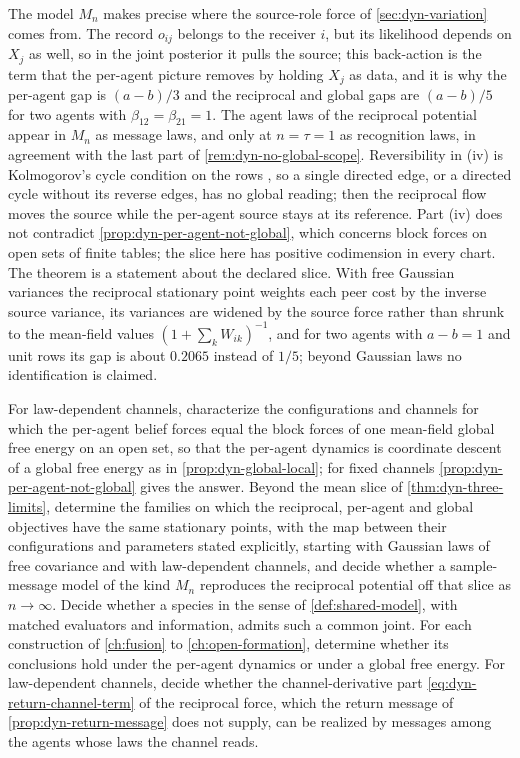The model $M_n$ makes precise where the source-role force of \cref{sec:dyn-variation} comes from. The record $o_{ij}$ belongs to the receiver $i$, but its likelihood depends on $X_j$ as well, so in the joint posterior it pulls the source; this back-action is the term that the per-agent picture removes by holding $X_j$ as data, and it is why the per-agent gap is $(a-b)/3$ and the reciprocal and global gaps are $(a-b)/5$ for two agents with $\beta_{12}=\beta_{21}=1$. The agent laws of the reciprocal potential appear in $M_n$ as message laws, and only at $n=\tau=1$ as recognition laws, in agreement with the last part of \cref{rem:dyn-no-global-scope}. Reversibility in (iv) is Kolmogorov's cycle condition on the rows \citep{Kolmogorov1936,Kelly1979}, so a single directed edge, or a directed cycle without its reverse edges, has no global reading; then the reciprocal flow moves the source while the per-agent source stays at its reference. Part (iv) does not contradict \cref{prop:dyn-per-agent-not-global}, which concerns block forces on open sets of finite tables; the slice here has positive codimension in every chart. The theorem is a statement about the declared slice. With free Gaussian variances the reciprocal stationary point weights each peer cost by the inverse source variance, its variances are widened by the source force rather than shrunk to the mean-field values $(1+\sum_kW_{ik})^{-1}$, and for two agents with $a-b=1$ and unit rows its gap is about $0.2065$ instead of $1/5$; beyond Gaussian laws no identification is claimed.

For law-dependent channels, characterize the configurations and channels for which the per-agent belief forces equal the block forces of one mean-field global free energy on an open set, so that the per-agent dynamics is coordinate descent of a global free energy as in \cref{prop:dyn-global-local}; for fixed channels \cref{prop:dyn-per-agent-not-global} gives the answer. Beyond the mean slice of \cref{thm:dyn-three-limits}, determine the families on which the reciprocal, per-agent and global objectives have the same stationary points, with the map between their configurations and parameters stated explicitly, starting with Gaussian laws of free covariance and with law-dependent channels, and decide whether a sample-message model of the kind $M_n$ reproduces the reciprocal potential off that slice as $n\to\infty$. Decide whether a species in the sense of \cref{def:shared-model}, with matched evaluators and information, admits such a common joint. For each construction of \cref{ch:fusion} to \cref{ch:open-formation}, determine whether its conclusions hold under the per-agent dynamics or under a global free energy. For law-dependent channels, decide whether the channel-derivative part \cref{eq:dyn-return-channel-term} of the reciprocal force, which the return message of \cref{prop:dyn-return-message} does not supply, can be realized by messages among the agents whose laws the channel reads.
